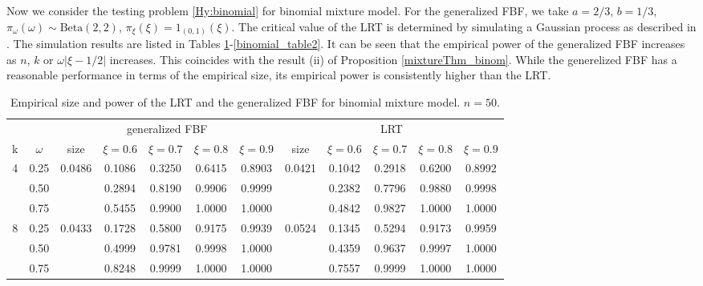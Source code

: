 \documentclass[11pt]{article}
\theoremstyle{plain}
\theoremstyle{definition}
\theoremstyle{remark}
\begin{document}
Now we consider the testing problem \eqref{Hy:binomial} for binomial mixture model.
For the generalized FBF, we take $a = 2/3$, $b = 1/3$,  $\pi_\omega(\omega)\sim \text{Beta}(2, 2)$, $\pi_\xi(\xi) = 1_{(0,1)}(\xi)$.
The critical value of the LRT is determined by simulating a Gaussian process as described in \cite{Chernoff1995}.
The simulation results are listed in Tables \ref{binomial_table1}-\ref{binomial_table2}.
It can be seen that the empirical power of the generalized FBF increases as $n$, $k$ or $\omega |\xi - 1/2|$ increases.
This coincides with the result (ii) of Proposition \ref{mixtureThm_binom}.
While the generelized FBF has a reasonable performance in terms of the empirical size, its empirical power is consistently higher than the LRT.
\begin{table}[ht]
    \caption{Empirical size and power of the LRT and the generalized FBF for binomial mixture model. $n=50$.}
    \label{binomial_table1}
    \small
    \centering
    \begin{tabular}{cccccccccccc}
        \toprule
         & & \multicolumn{5}{c}{generalized FBF} &\multicolumn{5}{c}{LRT}\\
        \cmidrule(r){3-7}\cmidrule(r){8-12}
        k & $\omega$ 
        & size & $\xi= 0.6$& $\xi= 0.7$& $\xi= 0.8$& $\xi= 0.9$   
        & size & $\xi= 0.6$& $\xi= 0.7$& $\xi= 0.8$& $\xi= 0.9$
        \\ 
        \midrule
        4 &0.25 & 0.0486& 0.1086& 0.3250& 0.6415 & 0.8903 & 0.0421& 0.1042 & 0.2918 & 0.6200 &0.8992 \\
        &0.50   &       & 0.2894& 0.8190& 0.9906 &0.9999&         &0.2382 & 0.7796 & 0.9880 & 0.9998\\
        &0.75 &         &0.5455 & 0.9900& 1.0000 &1.0000&         &0.4842 & 0.9827 & 1.0000 & 1.0000 \\
        \midrule
        8 &0.25 & 0.0433& 0.1728& 0.5800& 0.9175 & 0.9939 & 0.0524& 0.1345 & 0.5294 & 0.9173 &0.9959\\
        &0.50   &       & 0.4999& 0.9781& 0.9998 & 1.0000 &       & 0.4359 & 0.9637 & 0.9997 &1.0000\\
        &0.75   &       & 0.8248& 0.9999& 1.0000 & 1.0000 &       & 0.7557 & 0.9999 & 1.0000 &1.0000\\
        \bottomrule

    \end{tabular}

\end{table}
\end{document}
